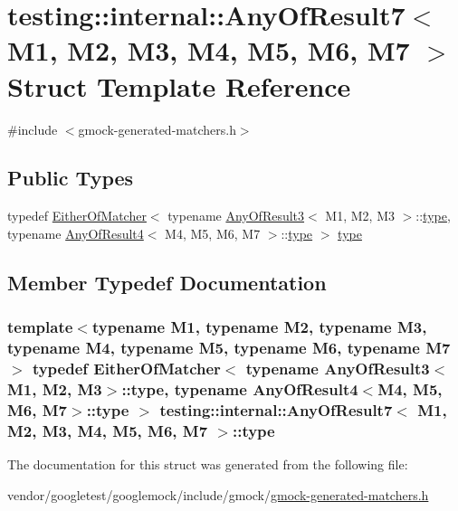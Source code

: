 \hypertarget{structtesting_1_1internal_1_1AnyOfResult7}{}\section{testing\+:\+:internal\+:\+:Any\+Of\+Result7$<$ M1, M2, M3, M4, M5, M6, M7 $>$ Struct Template Reference}
\label{structtesting_1_1internal_1_1AnyOfResult7}


{\ttfamily \#include $<$gmock-\/generated-\/matchers.\+h$>$}

\subsection*{Public Types}
\begin{DoxyCompactItemize}
\item 
typedef \hyperlink{classtesting_1_1internal_1_1EitherOfMatcher}{Either\+Of\+Matcher}$<$ typename \hyperlink{structtesting_1_1internal_1_1AnyOfResult3}{Any\+Of\+Result3}$<$ M1, M2, M3 $>$\+::\hyperlink{structtesting_1_1internal_1_1AnyOfResult7_a976873478921520833464a86f840abe8}{type}, typename \hyperlink{structtesting_1_1internal_1_1AnyOfResult4}{Any\+Of\+Result4}$<$ M4, M5, M6, M7 $>$\+::\hyperlink{structtesting_1_1internal_1_1AnyOfResult7_a976873478921520833464a86f840abe8}{type} $>$ \hyperlink{structtesting_1_1internal_1_1AnyOfResult7_a976873478921520833464a86f840abe8}{type}
\end{DoxyCompactItemize}


\subsection{Member Typedef Documentation}
\subsubsection[{\texorpdfstring{type}{type}}]{\setlength{\rightskip}{0pt plus 5cm}template$<$typename M1, typename M2, typename M3, typename M4, typename M5, typename M6, typename M7$>$ typedef {\bf Either\+Of\+Matcher}$<$ typename {\bf Any\+Of\+Result3}$<$M1, M2, M3$>$\+::{\bf type}, typename {\bf Any\+Of\+Result4}$<$M4, M5, M6, M7$>$\+::{\bf type} $>$ {\bf testing\+::internal\+::\+Any\+Of\+Result7}$<$ M1, M2, M3, M4, M5, M6, M7 $>$\+::{\bf type}}\hypertarget{structtesting_1_1internal_1_1AnyOfResult7_a976873478921520833464a86f840abe8}{}\label{structtesting_1_1internal_1_1AnyOfResult7_a976873478921520833464a86f840abe8}


The documentation for this struct was generated from the following file\+:\begin{DoxyCompactItemize}
\item 
vendor/googletest/googlemock/include/gmock/\hyperlink{gmock-generated-matchers_8h}{gmock-\/generated-\/matchers.\+h}\end{DoxyCompactItemize}
